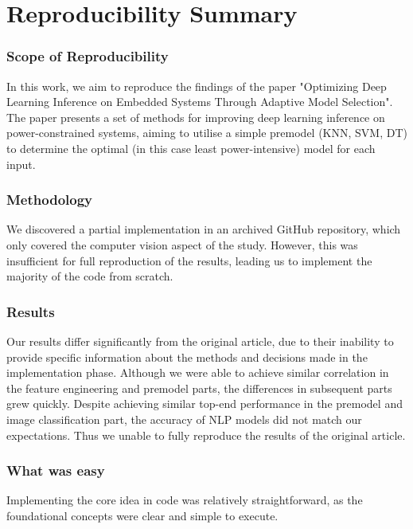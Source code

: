 \section*{Reproducibility Summary}


\subsubsection{Scope of Reproducibility}
In this work, we aim to reproduce the findings of the paper "Optimizing Deep Learning Inference on Embedded Systems Through Adaptive Model Selection"\supercite{marco2019optimizing}. The paper presents a set of methods for improving deep learning inference on power-constrained systems, aiming to utilise a simple premodel (KNN, SVM, DT) to determine the optimal (in this case least power-intensive) model for each input.

\subsubsection{Methodology}
We discovered a partial implementation in an archived GitHub repository, which only covered the computer vision aspect of the study. However, this was insufficient for full reproduction of the results, leading us to implement the majority of the code from scratch.

\subsubsection{Results}
Our results differ significantly from the original article, due to their inability to provide specific information about the methods and decisions made in the implementation phase. Although we were able to achieve similar correlation in the feature engineering and premodel parts, the differences in subsequent parts grew quickly. Despite achieving similar top-end performance in the premodel and image classification part, the accuracy of NLP models did not match our expectations. Thus we unable to fully reproduce the results of the original article.

\subsubsection{What was easy}
Implementing the core idea in code was relatively straightforward, as the foundational concepts were clear and simple to execute.

